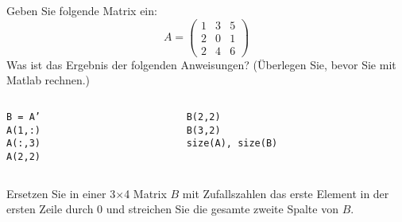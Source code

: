     \secMexercise
    \begin{frame}
        \frameMexercise
        \begin{exercise}
            \sloppy
            Geben Sie folgende Matrix ein:\\
            \begin{displaymath}
                A =
                \begin{pmatrix}
                    1 & 3 & 5 \\
                    2 & 0 & 1 \\
                    2 & 4 & 6
                \end{pmatrix}
            \end{displaymath}
             Was ist das Ergebnis der folgenden Anweisungen? (Überlegen Sie, bevor Sie mit Matlab rechnen.) \\

             \begin{columns}[t]
               \begin{column}{5cm}
                 \texttt{B = A'} \keys{\return} \\
                 \texttt{A(1,:)} \keys{\return} \\
                 \texttt{A(:,3)} \keys{\return} \\
                 \texttt{A(2,2)} \keys{\return} \\
               \end{column}
               \begin{column}{5cm}
                   \texttt{B(2,2)} \keys{\return} \\
                   \texttt{B(3,2)} \keys{\return} \\
                   \texttt{size(A), size(B)} \keys{\return}
               \end{column}
             \end{columns}
        \end{exercise}
    \end{frame}

    \secMexercise
    \begin{frame}
        \frameMexercise
        \begin{exercise}
            \sloppy
            Ersetzen Sie in einer 3$\times$4 Matrix $B$ mit Zufallszahlen das erste Element in der ersten Zeile durch 0 und
            streichen Sie die gesamte zweite Spalte von $B$.
        \end{exercise}
    \end{frame}

